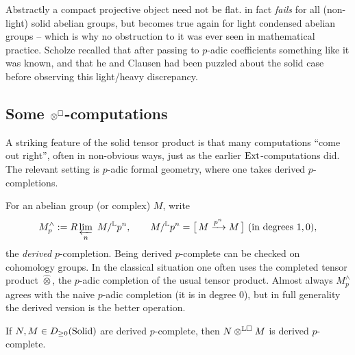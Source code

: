 \begin{remark}
\label{rmk:6:flat-light}
Abstractly a compact projective object need not be flat.
 in fact \emph{fails} for all (non-light) solid abelian groups,
but becomes true again for light condensed abelian groups -- which is why no
obstruction to it was ever seen in mathematical practice. Scholze recalled that
after passing to $p$-adic coefficients something like it was known, and that he
and Clausen had been puzzled about the solid case before observing this
light/heavy discrepancy.
\end{remark}

\subsection{Some \texorpdfstring{$\otimes^{\square}$-}{solid tensor product }computations}

A striking feature of the solid tensor product is that many computations ``come
out right'', often in non-obvious ways, just as the earlier $\operatorname{Ext}$-computations
did. The relevant setting is $p$-adic formal geometry, where one takes derived
$p$-completions.

\begin{notation}
\label{not:6:derived-p-completion}
For an abelian group (or complex) $M$, write
\begin{equation*}
M^{\wedge}_{p}:=R\varprojlim_{n}\ M/^{\mathbb{L}}p^{n},
\qquad
M/^{\mathbb{L}}p^{n}=\bigl[\,M\xrightarrow{p^{n}}M\,\bigr]\ (\text{in degrees }1,0),
\end{equation*}
the \emph{derived} $p$-completion. Being derived $p$-complete can be checked on
cohomology groups. In the classical situation one often uses the completed tensor
product $\widehat{\otimes}$, the $p$-adic completion of the usual tensor product.
Almost always $M^{\wedge}_{p}$ agrees with the naive $p$-adic completion (it is in
degree $0$), but in full generality the derived version is the better operation.
\end{notation}

\begin{proposition}
\label{prop:6:tensor-p-complete}
If $N,M\in D_{\geq0}(\mathrm{Solid})$ are derived $p$-complete, then
$N\otimes^{\mathbb{L}\square}M$ is derived $p$-complete.
\end{proposition}

